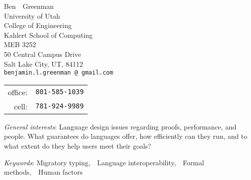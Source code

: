 \documentclass[11pt]{article}
\makeatletter
\renewcommand{\maketitle}{
\begin{center}
  {\large{Ben~~Greenman}}
  \\ University of Utah
  \\ College of Engineering
  \\ Kahlert School of Computing
  \\ MEB 3252
  \\ 50 Central Campus Drive
  \\ Salt Lake City, UT, 84112
\vspace{0.1cm}
\\\texttt{\footnotesize benjamin.l.greenman\,@\,gmail.com}
  \\{\footnotesize\begin{tabular}{r@{~~}l} \\[-2ex]
    office: & \texttt{801-585-1039} \\
    cell: & \texttt{781-924-9989}
  \end{tabular}}
\end{center}
}
\makeatother
\begin{document}
\maketitle


\newcommand{\interestpar}[2]{\noindent\emph{#1}\/: #2}
\newcommand{\isep}{,~~}

\interestpar{General interests}{
Language design
issues regarding
proofs, performance, and people.
What guarantees do languages offer,
how efficiently can they run,
and to what extent do they help users meet their goals?
}

\interestpar{Keywords}{Migratory typing\isep{}Language interoperability\isep{}Formal methods\isep{}Human factors}

\end{document}
